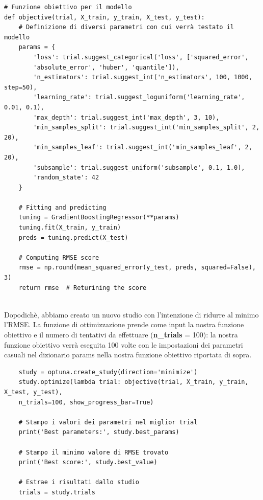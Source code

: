 \documentclass{article}
\begin{document}
\begin{verbatim} 
# Funzione obiettivo per il modello
def objective(trial, X_train, y_train, X_test, y_test):
    # Definizione di diversi parametri con cui verrà testato il modello
    params = {
        'loss': trial.suggest_categorical('loss', ['squared_error', 
        'absolute_error', 'huber', 'quantile']),
        'n_estimators': trial.suggest_int('n_estimators', 100, 1000, step=50),
        'learning_rate': trial.suggest_loguniform('learning_rate', 0.01, 0.1),
        'max_depth': trial.suggest_int('max_depth', 3, 10),
        'min_samples_split': trial.suggest_int('min_samples_split', 2, 20),
        'min_samples_leaf': trial.suggest_int('min_samples_leaf', 2, 20),
        'subsample': trial.suggest_uniform('subsample', 0.1, 1.0),
        'random_state': 42
    }

    # Fitting and predicting
    tuning = GradientBoostingRegressor(**params)
    tuning.fit(X_train, y_train)
    preds = tuning.predict(X_test)

    # Computing RMSE score
    rmse = np.round(mean_squared_error(y_test, preds, squared=False), 3)
    return rmse  # Returining the score
\end{verbatim}
\\
Dopodichè, abbiamo creato un nuovo studio con l'intenzione di ridurre al minimo l'RMSE. La funzione di ottimizzazione prende come input la nostra funzione obiettivo e il numero di tentativi da effettuare (\textbf{n\_trials} = 100): la nostra funzione obiettivo verrà eseguita 100 volte con le impostazioni dei parametri casuali nel dizionario params nella nostra funzione obiettivo riportata di sopra.
\begin{verbatim} 
    study = optuna.create_study(direction='minimize')
    study.optimize(lambda trial: objective(trial, X_train, y_train, X_test, y_test),
    n_trials=100, show_progress_bar=True)

    # Stampo i valori dei parametri nel miglior trial
    print('Best parameters:', study.best_params)

    # Stampo il minimo valore di RMSE trovato
    print('Best score:', study.best_value)

    # Estrae i risultati dallo studio
    trials = study.trials
\end{verbatim}
\end{document}
